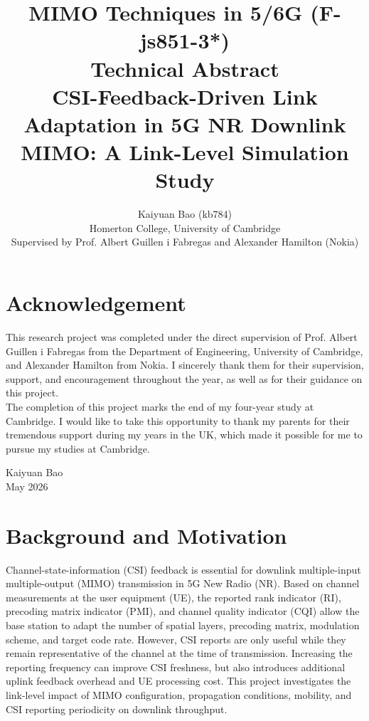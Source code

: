 \documentclass[a4paper,12pt,onecolumn]{article}
\title{ 
	MIMO Techniques in 5/6G (F-js851-3*) \\ [0.5cm] \large \textbf{Technical Abstract} \\ \vspace{0.45cm}
	\LARGE \textbf{CSI-Feedback-Driven Link Adaptation in 5G NR Downlink MIMO: A Link-Level Simulation Study}}
\author{
	Kaiyuan Bao (kb784)\\
	Homerton College, University of Cambridge\\[6pt]
	\small Supervised by Prof. Albert Guillen i Fabregas and Alexander Hamilton (Nokia)
}
\begin{document}
	
	
\clearpage

\setcounter{page}{1}
\newpage
\section*{\centering Acknowledgement}
	This research project was completed under the direct supervision of Prof. Albert Guillen i Fabregas from the Department of Engineering, University of Cambridge, and Alexander Hamilton from Nokia. I sincerely thank them for their supervision, support, and encouragement throughout the year, as well as for their guidance on this project. \\
	\newline 
	The completion of this project marks the end of my four-year study at Cambridge. I would like to take this opportunity to thank my parents for their tremendous support during my years in the UK, which made it possible for me to pursue my studies at Cambridge.

\begin{flushright}
	Kaiyuan Bao \\ May 2026
	\end{flushright}

\newpage



	\maketitle
	\vspace{-35pt}
	\pagestyle{fancy}
	\fancyhead[L]{}   %
	\fancyhead[C]{} 
	\fancyhead[R]{\rightmark}
	\renewcommand{\subsectionmark}[1]{\markright{#1}}  %
	
\thispagestyle{empty}
\section*{Background and Motivation}
		Channel-state-information (CSI) feedback is essential for downlink multiple-input multiple-output (MIMO) transmission in 5G New Radio (NR). Based on channel measurements at the user equipment (UE), the reported rank indicator (RI), precoding matrix indicator (PMI), and channel quality indicator (CQI) allow the base station to adapt the number of spatial layers, precoding matrix, modulation scheme, and target code rate. However, CSI reports are only useful while they remain representative of the channel at the time of transmission. Increasing the reporting frequency can improve CSI freshness, but also introduces additional uplink feedback overhead and UE processing cost. This project investigates the link-level impact of MIMO configuration, propagation conditions, mobility, and CSI reporting periodicity on downlink throughput.
\end{document}

